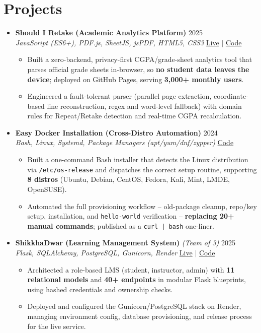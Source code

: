 \documentclass[a4paper]{article}
\newcommand{\resumeItem}[1]{
  \item\small{
    {#1 \vspace{-2pt}}
  }
}
\newcommand{\resumeItemListStart}{\begin{itemize}}
\newcommand{\resumeItemListEnd}{\end{itemize}\vspace{-5pt}}
\begin{document}
\section{Projects}
  \begin{itemize}[leftmargin=0.15in, label={}, itemsep=6pt]

    \item
    \textbf{Should I Retake (Academic Analytics Platform)} \hfill 2025\\
    \small\textit{JavaScript (ES6+), PDF.js, SheetJS, jsPDF, HTML5, CSS3} \hfill
    \href{https://badhon495.github.io/should-i-retake/}{Live} $|$
    \href{https://github.com/badhon495/should-i-retake}{Code}
    \vspace{-5pt}
    \resumeItemListStart
      \resumeItem{Built a zero-backend, privacy-first CGPA/grade-sheet analytics tool that parses official grade sheets in-browser, so \textbf{no student data leaves the device}; deployed on GitHub Pages, serving \textbf{3,000+ monthly users}.}
      \resumeItem{Engineered a fault-tolerant parser (parallel page extraction, coordinate-based line reconstruction, regex and word-level fallback) with domain rules for Repeat/Retake detection and real-time CGPA recalculation.}
    \resumeItemListEnd

    \item
    \textbf{Easy Docker Installation (Cross-Distro Automation)} \hfill 2024\\
    \small\textit{Bash, Linux, Systemd, Package Managers (apt/yum/dnf/zypper)} \hfill
    \href{https://github.com/badhon495/Easy_Docker_Installation}{Code}
    \vspace{-5pt}
    \resumeItemListStart
      \resumeItem{Built a one-command Bash installer that detects the Linux distribution via \texttt{/etc/os-release} and dispatches the correct setup routine, supporting \textbf{8 distros} (Ubuntu, Debian, CentOS, Fedora, Kali, Mint, LMDE, OpenSUSE).}
      \resumeItem{Automated the full provisioning workflow -- old-package cleanup, repo/key setup, installation, and \texttt{hello-world} verification -- \textbf{replacing 20+ manual commands}; published as a \texttt{curl | bash} one-liner.}
    \resumeItemListEnd

    \item
    \textbf{ShikkhaDwar (Learning Management System)} \textit{\small (Team of 3)} \hfill 2025\\
    \small\textit{Flask, SQLAlchemy, PostgreSQL, Gunicorn, Render} \hfill
    \href{https://shikkhadwar-81r2.onrender.com/}{Live} $|$
    \href{https://github.com/nihal-kabir/ShikkhaDwar}{Code}
    \vspace{-5pt}
    \resumeItemListStart
      \resumeItem{Architected a role-based LMS (student, instructor, admin) with \textbf{11 relational models} and \textbf{40+ endpoints} in modular Flask blueprints, using hashed credentials and ownership checks.}
      \resumeItem{Deployed and configured the Gunicorn/PostgreSQL stack on Render, managing environment config, database provisioning, and release process for the live service.}
    \resumeItemListEnd

  \end{itemize}
\end{document}
